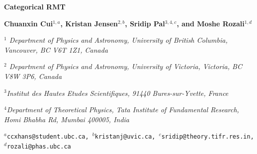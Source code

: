 \documentclass[11pt]{article}
\providecommand{\Zc}{Z(\cC)}
\numberwithin{equation}{section}
\begin{document}
\baselineskip=15.5pt
\pagestyle{plain}
\setcounter{page}{1}
\newcommand{\one}{\mathbb{1}}
\newcommand{\Htot}{\mathcal{H}_{\rm tot}}
\newcommand{\Hil}{\mathcal{H}}
\newcommand{\cat}{\mathcal{C}}
\newcommand{\Tube}{\mathrm{Tube}}
\newcommand{\Irr}{\mathrm{Irr}}
\newcommand{\End}{\mathrm{End}}
\newcommand{\Hom}{\mathrm{Hom}}
\newcommand{\VecG}{\mathrm{Vec}}
\newcommand{\Fib}{\mathrm{Fib}}
\newcommand{\sgn}{\mathrm{sgn}}
\newcommand{\Mult}{\mathcal{M}}
\newcommand{\Cc}{\mathsf{C}}
\newcommand{\C}{\mathcal C}
\newcommand{\Z}{\mathbb Z}
\newcommand{\Mat}{\operatorname{Mat}}
\newcommand{\Rep}{\operatorname{Rep}}
\newcommand{\Tr}{\operatorname{Tr}}
\newcommand{\id}{\mathbf 1}
\newcommand{\cH}{\mathcal H}
\newcommand{\cA}{\mathcal A}
\newcommand{\cC}{\mathcal C}
\newcommand{\cN}{\mathcal N}
\newcommand{\qdim}{\operatorname{qdim}}
\newcommand{\rmean}{\langle r\rangle}
\newcommand{\DS}{D(S_3)}
\newcommand{\cL}{\mathcal{L}}
\newcommand{\CRT}{\mathsf{CRT}}
\newcommand{\Spec}{\operatorname{Spec}}
\providecommand{\Zc}{Z(\cC)}
\begin{center}
{\LARGE \bf Categorical RMT}
\vskip 1cm

\textbf{Chuanxin Cui$^{1,a}$, Kristan Jensen$^{2,b}$, Sridip Pal$^{3,4,c}$, and Moshe Rozali$^{1,d}$}

\vspace{0.5cm}

{\it ${}^1$ Department of Physics and Astronomy, University of British Columbia, Vancouver, BC V6T 1Z1, Canada \\}

{\it ${}^2$ Department of Physics and Astronomy, University of Victoria, Victoria, BC V8W 3P6, Canada\\}

{\it ${}^3$Institut des Hautes Etudes Scientifiques, 91440 Bures-sur-Yvette, France}

{\it ${}^4$Department of Theoretical Physics, Tata Institute of Fundamental Research, Homi Bhabha Rd, Mumbai 400005, India}

\vspace{0.3cm}

{\tt ${}^a$ccxhans@student.ubc.ca, ${}^b$kristanj@uvic.ca, ${}^c$sridip@theory.tifr.res.in, ${}^d$rozali@phas.ubc.ca\\}


\medskip

\end{center}

\vskip1cm
\end{document}
